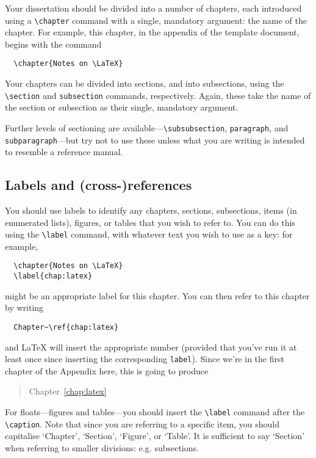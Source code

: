 \documentclass[dissertation]{softeng}
\begin{document}
Your dissertation should be divided into a number of chapters, each
introduced using a \verb|\chapter| command with a single, mandatory
argument: the name of the chapter.  For example, this chapter, in the
appendix of the template document, begins with the command
\begin{verbatim}
  \chapter{Notes on \LaTeX}
\end{verbatim}
Your chapters can be divided into sections, and into subsections,
using the \verb|\section| and \verb|subsection| commands,
respectively.  Again, these take the name of the section or subsection
as their single, mandatory argument.  

Further levels of sectioning are available---\verb|\subsubsection|,
\verb|paragraph|, and \verb|subparagraph|---but try not to use these
unless what you are writing is intended to resemble a reference
manual.   

\subsection{Labels and (cross-)references}
\label{sec:labelling}

You should use labels to identify any chapters, sections, subsections,
items (in enumerated lists), figures, or tables that you wish to refer
to.  You can do this using the \verb|\label| command, with whatever
text you wish to use as a key: for example, 
\begin{verbatim}
  \chapter{Notes on \LaTeX}
  \label{chap:latex}
\end{verbatim}
might be an appropriate label for this chapter.  You can then refer to
this chapter by writing 
\begin{verbatim}
  Chapter~\ref{chap:latex}
\end{verbatim}
and {\LaTeX} will insert the appropriate number (provided that you've
run it at least once since inserting the corresponding \verb|label|).
Since we're in the first chapter of the Appendix here, this is going
to produce 
\begin{quote}
  Chapter~\ref{chap:latex}
\end{quote}
For floats---figures and tables---you should insert the \verb|\label|
command after the \verb|\caption|.  Note that since you are referring
to a specific item, you should capitalise `Chapter', `Section',
`Figure', or `Table'.  It is sufficient to say `Section' when
referring to smaller divisions: e.g. subsections. 
\end{document}
